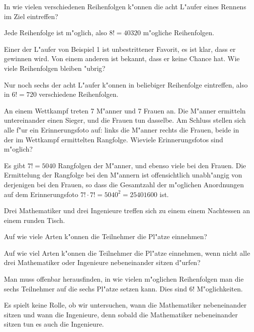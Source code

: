 \begin{beispiele}
\item In wie vielen verschiedenen Reihenfolgen k"onnen die acht L"aufer
eines Rennens im Ziel eintreffen?

\begin{loesung}
Jede Reihenfolge ist m"oglich, also $8!=40320$ m"ogliche Reihenfolgen.
\end{loesung}

\item Einer der L"aufer von Beispiel 1 ist unbestrittener Favorit,
es ist klar, dass er gewinnen wird.
Von einem anderen ist bekannt, dass er keine Chance hat.
Wie viele Reihenfolgen bleiben "ubrig?

\begin{loesung}
Nur noch sechs der acht L"aufer k"onnen in beliebiger Reihenfolge
eintreffen, also in $6!=720$ verschiedene Reihenfolgen.
\end{loesung}

\item An einem Wettkampf treten 7 M"anner und 7 Frauen an.
Die M"anner
ermitteln untereinander einen Sieger, und die Frauen tun dasselbe.
Am Schluss stellen sich alle f"ur ein Erinnerungsfoto auf: links
die M"anner rechts die Frauen, beide in der im Wettkampf ermittelten
Rangfolge.
Wieviele Erinnerungsfotos sind m"oglich?

\begin{loesung}
Es gibt $7!=5040$ Rangfolgen der M"anner, und ebenso viele bei den
Frauen.
Die Ermittelung der Rangfolge bei den M"annern ist offensichtlich
unabh"angig von derjenigen bei den Frauen, so dass die Gesamtzahl der
m"oglichen Anordnungen auf dem Erinnerungsfoto $7!\cdot 7!=5040^2=25401600$
ist.
\end{loesung}

\item
\label{nachtessen}
Drei Mathematiker und drei Ingenieure treffen sich zu einem
einem Nachtessen an einem runden Tisch.
\begin{teilaufgaben}
\item
Auf wie viele Arten k"onnen die Teilnehmer die Pl"atze einnehmen?
\item
Auf wie viel Arten k"onnen 
die Teilnehmer die Pl"atze einnehmen, wenn nicht alle drei Mathematiker
oder Ingenieure nebeneinander sitzen d"urfen?
\end{teilaufgaben}

\begin{loesung}
\begin{teilaufgaben}
\item
Man muss offenbar herausfinden, in wie vielen m"oglichen Reihenfolgen
man die sechs Teilnehmer auf die sechs Pl"atze setzen kann.
Dies sind $6!$ M"oglichkeiten.
\item
Es spielt keine Rolle, ob wir untersuchen, wann die Mathematiker 
nebeneinander sitzen und wann die Ingenieure, denn sobald die Mathematiker
nebeneinander sitzen tun es auch die Ingenieure.


\end{teilaufgaben}
\end{loesung}
\end{beispiele}
